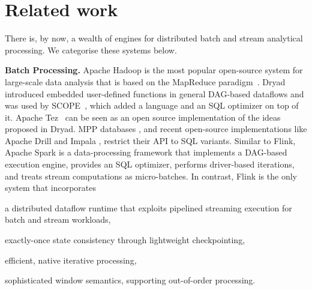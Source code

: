 \documentclass[11pt]{article}
\newcommand{\para}[1]{\vspace{2mm}\noindent\textbf{#1}}
\begin{document}
\vspace{-4mm}
\section{Related work}
\vspace{-2mm}
\label{sec:related}
There is, by now, a wealth of engines for distributed batch and stream analytical processing. We categorise these systems below. 

\para{Batch Processing.} Apache Hadoop is the most popular open-source system for large-scale data analysis that is based on the MapReduce paradigm~\cite{DBLP:journals/cacm/DeanG08}. Dryad~\cite{isard2007dryad} introduced embedded user-defined functions in general DAG-based dataflows and was used by SCOPE~\cite{scopeOptimizer}, which added a language and an SQL optimizer on top of it. Apache Tez~\cite{saha2015apache} can be seen as an open source implementation of the ideas proposed in Dryad. MPP databases \cite{dewitt1990gamma}, and recent open-source implementations like Apache Drill and Impala \cite{kornacker2015impala}, restrict their API to SQL variants. Similar to Flink, Apache Spark \cite{DBLP:conf/hotcloud/ZahariaCFSS10} is a data-processing framework that implements a DAG-based execution engine, provides an SQL optimizer, performs driver-based iterations, and treats stream computations as micro-batches. In contrast, Flink is the only system that incorporates
\begin{inparaenum}[i)]
  \item a distributed dataflow runtime that exploits pipelined streaming execution for batch and stream workloads,
  \item exactly-once state consistency through lightweight checkpointing,
  \item efficient, native iterative processing,
  \item sophisticated window semantics, supporting out-of-order processing.
\end{inparaenum}
\end{document}
